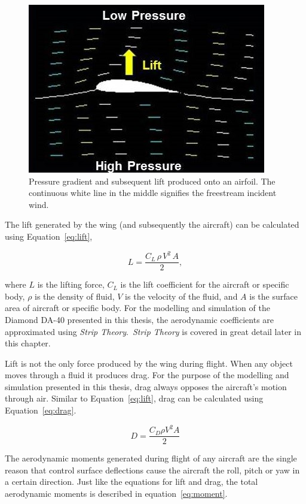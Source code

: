 \begin{figure}[!ht]\label{fig:pressuregradient}
    \centering
    \includegraphics[width=0.75\linewidth]{Figures/foillift.jpg}
    \caption{Pressure gradient and subsequent lift produced onto an airfoil. The continuous white line in the middle signifies the freestream incident wind.}
\end{figure}

The lift generated by the wing (and subsequently the aircraft) can be calculated using Equation~\ref{eq:lift},

\begin{equation}\label{eq:lift}
    L = \frac{C_L \, \rho \, V^2 \, A}{2},
\end{equation}

where \(L\) is the lifting force, \(C_L\) is the lift coefficient for the aircraft or specific body, \( \rho \) is the density of fluid, \(V\) is the velocity of the fluid, and \(A\) is the surface area of aircraft or specific body. For the modelling and simulation of the Diamond DA-40 presented in this thesis, the aerodynamic coefficients are approximated using \textit{Strip Theory}.~\textit{Strip Theory} is covered in great detail later in this chapter.

Lift is not the only force produced by the wing during flight. When any object moves through a fluid it produces drag. For the purpose of the modelling and simulation presented in this thesis, drag always opposes the aircraft's motion through air. Similar to Equation~\ref{eq:lift}, drag can be calculated using Equation~\ref{eq:drag}.

\begin{equation}\label{eq:drag}
    D = \frac{C_D \rho V^2 A}{2}
\end{equation}

The aerodynamic moments generated during flight of any aircraft are the single reason that control surface deflections cause the aircraft the roll, pitch or yaw in a certain direction. Just like the equations for lift and drag, the total aerodynamic moments is described in equation~\ref{eq:moment}.

